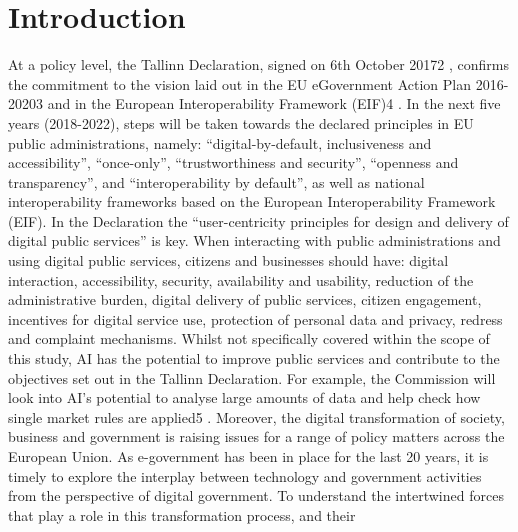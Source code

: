 
\chapter{Introduction}  %

\ifpdf
    \graphicspath{{Chapter1/Figs/Raster/}{Chapter1/Figs/PDF/}{Chapter1/Figs/}}
\else
    \graphicspath{{Chapter1/Figs/Vector/}{Chapter1/Figs/}}
\fi

At a policy level, the Tallinn Declaration, signed on 6th October 20172
, confirms the commitment to the vision
laid out in the EU eGovernment Action Plan 2016-20203 and in the European Interoperability Framework
(EIF)4
. In the next five years (2018-2022), steps will be taken towards the declared principles in EU public
administrations, namely: “digital-by-default, inclusiveness and accessibility”, “once-only”, “trustworthiness and
security”, “openness and transparency”, and “interoperability by default”, as well as national interoperability
frameworks based on the European Interoperability Framework (EIF).
In the Declaration the “user-centricity principles for design and delivery of digital public services” is key.
When interacting with public administrations and using digital public services, citizens and businesses
should have: digital interaction, accessibility, security, availability and usability, reduction of the
administrative burden, digital delivery of public services, citizen engagement, incentives for digital service
use, protection of personal data and privacy, redress and complaint mechanisms. Whilst not specifically
covered within the scope of this study, AI has the potential to improve public services and contribute to the
objectives set out in the Tallinn Declaration. For example, the Commission will look into AI's potential to
analyse large amounts of data and help check how single market rules are applied5
.
Moreover, the digital transformation of society, business and government is raising issues for a range of
policy matters across the European Union. As e-government has been in place for the last 20 years, it is
timely to explore the interplay between technology and government activities from the perspective of digital
government. To understand the intertwined forces that play a role in this transformation process, and their
